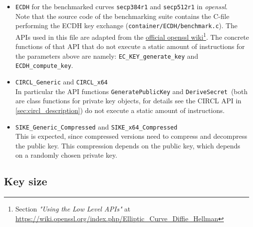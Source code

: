 \begin{itemize}
\item \texttt{\gls{ECDH}} for the benchmarked curves \texttt{secp384r1} and \texttt{secp512r1} in \textit{\gls{openssl}}.\\
Note that the source code of the benchmarking suite contains the C-file performing the \gls{ECDH} key exchange (\texttt{container/ECDH/benchmark.c}). The APIs used in this file are adapted from the \href{https://wiki.openssl.org/index.php/Elliptic\_Curve\_Diffie\_Hellman}{official \gls{openssl} wiki}\footnote{Section \textit{"Using the Low Level APIs"} at \url{https://wiki.openssl.org/index.php/Elliptic\_Curve\_Diffie\_Hellman}}. The concrete functions of that API that do not execute a static amount of instructions for the parameters above are namely: \texttt{EC\_KEY\_generate\_key} and \texttt{ECDH\_compute\_key}.
\item \texttt{\gls{CIRCL}\_Generic} and \texttt{\gls{CIRCL}\_x64}\\
In particular the API functions \texttt{GeneratePublicKey} and \texttt{DeriveSecret }(both are class functions for private key objects, for details see the \gls{CIRCL} API in \autoref{sec:circl_description}) do not execute a static amount of instructions.
\item \texttt{\gls{SIKE}\_Generic\_Compressed} and \texttt{\gls{SIKE}\_x64\_Compressed}\\
This is expected, since compressed versions need to compress and decompress the public key. This compression depends on the public key, which depends on a randomly chosen private key. 
\end{itemize}

\subsection{Key size}\label{sec:analysis_security_keys}

